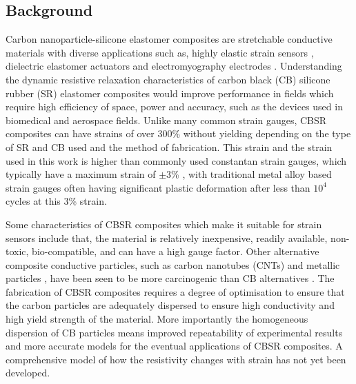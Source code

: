 \subsection{Background}
Carbon nanoparticle-silicone elastomer composites are stretchable conductive materials with diverse applications such as, highly elastic strain sensors \cite{Lacasse2010,Spahr2017,Kim2018}, dielectric elastomer actuators \cite{Henke2018,Liu2009} and electromyography electrodes \cite{Carpi2010,Kim2018,Mouri2019}. Understanding the dynamic resistive relaxation characteristics of carbon black (CB) silicone rubber (SR) elastomer composites would improve performance in fields which require high efficiency of space, power and accuracy, such as the devices used in biomedical and aerospace fields. Unlike many common strain gauges, CBSR composites can have strains of over 300\% without yielding \cite{Wang2010} depending on the type of SR and CB used and the method of fabrication. This strain and the strain used in this work is higher than commonly used constantan strain gauges, which typically have a maximum strain of $\pm 3$\% \cite{VishayPG2018}, with traditional metal alloy based strain gauges often having significant plastic deformation after less than $10^4$ cycles \cite{VishayPG2018} at this 3\% strain.


Some characteristics of CBSR composites which make it suitable for strain sensors include that, the material is relatively inexpensive, readily available, non-toxic, bio-compatible, and can have a high gauge factor. Other alternative composite conductive particles, such as carbon nanotubes (CNTs) \cite{Maddipatla2017,Wang2013} and metallic particles \cite{Quinsaat2015,Racles2021}, have been seen to be more carcinogenic than CB alternatives \cite{Fukushima2018,Ferdous2020,Rausch2004}. The fabrication of CBSR composites requires a degree of optimisation to ensure that the carbon particles are adequately dispersed to ensure high conductivity and high yield strength of the material. More importantly the homogeneous dispersion of CB particles means improved repeatability of experimental results and more accurate models for the eventual applications of CBSR composites. A comprehensive model of how the resistivity changes with strain has not yet been developed. 

